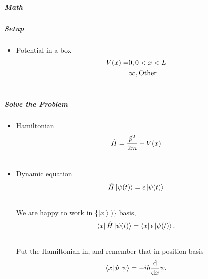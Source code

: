 \documentclass[letterpaper,10pt,english]{sphinxmanual}
\def\d{{\rm d}}
\newcommand{\bra}[1]{\left\langle #1\right|}
\newcommand{\ket}[1]{\left| #1\right\rangle}
\begin{document}
\subparagraph{Math}
\label{QuantumMechanics:math}

\subparagraph{Setup}
\label{QuantumMechanics:setup}\begin{itemize}
\item {} 
Potential in a box
\begin{gather}
\begin{split}V(x) = & 0,  0< x <L \\
 & \infty, \text{Other}\end{split}\notag\\\begin{split}\end{split}\notag
\end{gather}
\end{itemize}


\subparagraph{Solve the Problem}
\label{QuantumMechanics:solve-the-problem}\begin{itemize}
\item {} 
Hamiltonian
\begin{gather}
\begin{split}\hat H = \frac{\hat p ^2}{2 m } + V(x)\end{split}\notag\\\begin{split}\end{split}\notag
\end{gather}
\item {} 
Dynamic equation
\begin{gather}
\begin{split}\hat H \ket{\psi(t)} = \epsilon \ket{\psi(t)}\end{split}\notag\\\begin{split}\end{split}\notag
\end{gather}
We are happy to work in \{$\ket{x})$\} basis,
\begin{gather}
\begin{split}\bra{x} \hat H \ket{\psi(t)} = \bra{x} \epsilon \ket{\psi(t)} .\end{split}\notag\\\begin{split}\end{split}\notag
\end{gather}
Put the Hamiltonian in, and remember that in position basis
\begin{gather}
\begin{split}\bra{x} \hat p \ket{\psi} = - i \hbar\frac{\d}{\d x} \psi ,\end{split}\notag\\\begin{split}\end{split}\notag

\end{gather}
\end{itemize}
\end{document}
